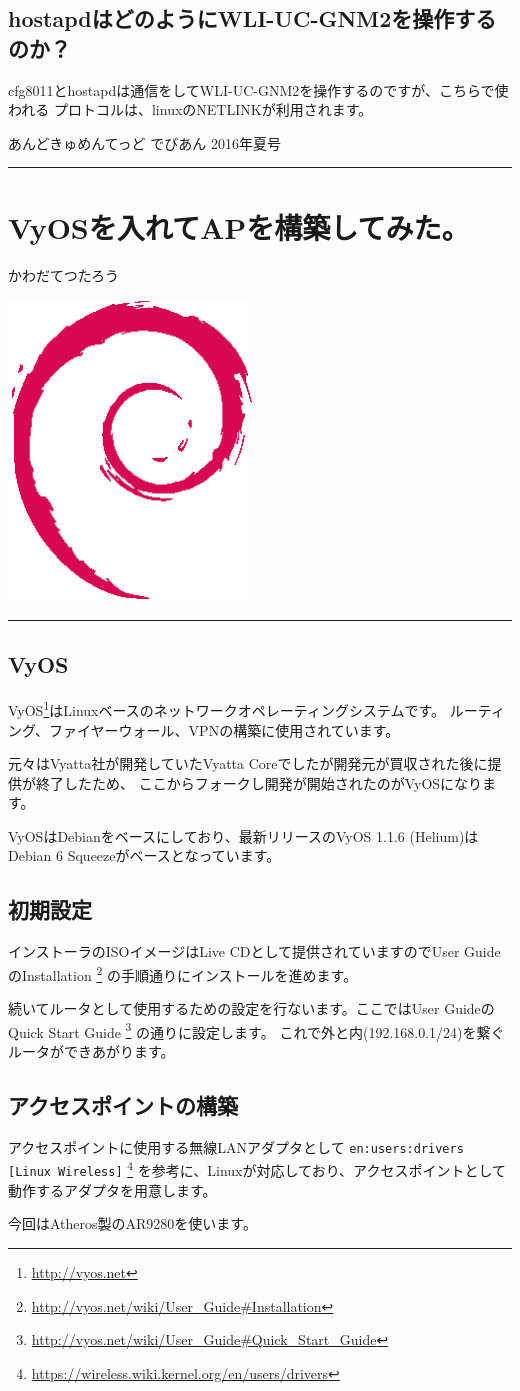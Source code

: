 \documentclass[mingoth,a4paper]{jsarticle}
\renewcommand{\dancersection}[2]{%
\newpage
あんどきゅめんてっど でびあん 2016年夏号
%
\vspace{0.1mm}\\
{\color{dancerdarkblue}\rule{\hsize}{2mm}}

%
%
\begin{minipage}[t]{0.6\hsize}
\color{dancerdarkblue}
\vspace{1cm}
\section{#1}
\hfill{}#2\\
\end{minipage}
\begin{minipage}[t]{0.4\hsize}
\vspace{-2cm}
\hfill{}\includegraphics[height=8cm]{image200502/openlogo-nd.eps}\\
\vspace{-5cm}
\end{minipage}
%
{\color{dancerlightblue}\rule{0.66\hsize}{2mm}}
%
\vspace{2cm}
}
\begin{document}
\subsection{hostapdはどのようにWLI-UC-GNM2を操作するのか？}


  cfg8011とhostapdは通信をしてWLI-UC-GNM2を操作するのですが、こちらで使われる
 プロトコルは、linuxのNETLINKが利用されます。



\dancersection{VyOSを入れてAPを構築してみた。}{かわだてつたろう}

\subsection{VyOS}

VyOS\footnote{\url{http://vyos.net}}はLinuxベースのネットワークオペレーティングシステムです。
ルーティング、ファイヤーウォール、VPNの構築に使用されています。

元々はVyatta社が開発していたVyatta Coreでしたが開発元が買収された後に提供が終了したため、
ここからフォークし開発が開始されたのがVyOSになります。

VyOSはDebianをベースにしており、最新リリースのVyOS 1.1.6 (Helium)は
Debian 6 Squeezeがベースとなっています。

\subsection{初期設定}

インストーラのISOイメージはLive CDとして提供されていますのでUser GuideのInstallation
\footnote{\url{http://vyos.net/wiki/User_Guide\#Installation}}
の手順通りにインストールを進めます。

続いてルータとして使用するための設定を行ないます。ここではUser GuideのQuick Start Guide
\footnote{\url{http://vyos.net/wiki/User_Guide\#Quick_Start_Guide}}
の通りに設定します。
これで外と内(192.168.0.1/24)を繋ぐルータができあがります。

\subsection{アクセスポイントの構築}

アクセスポイントに使用する無線LANアダプタとして
{\tt en:users:drivers [Linux Wireless]}
\footnote{\url{https://wireless.wiki.kernel.org/en/users/drivers}}
を参考に、Linuxが対応しており、アクセスポイントとして動作するアダプタを用意します。

今回はAtheros製のAR9280を使います。
\end{document}
